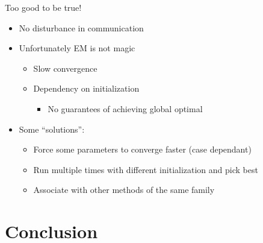 \documentclass[handout,aspectratio=169]{beamer}
\begin{document}

\begin{frame}{Too good to be true!}{}
  \begin{itemize}[<+(1)->]
    \item No disturbance in communication
    \item Unfortunately EM is not magic
          \begin{itemize}
            \item Slow convergence
            \item Dependency on initialization
                  \begin{itemize}
                    \item No guarantees of achieving global optimal
                  \end{itemize}
          \end{itemize}
    \item Some ``solutions'':
          \begin{itemize}
            \item Force some parameters to converge faster (case dependant)
            \item Run multiple times with different initialization and pick best
            \item Associate with other methods of the same family
          \end{itemize}
  \end{itemize}
\end{frame}


\section{Conclusion}
\end{document}
